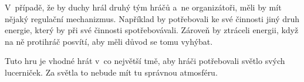 V~případě, že by duchy hrál druhý tým hráčů a~ne organizátoři, měli by mít nějaký regulační mechanizmus.
Například by potřebovali ke své činnosti jiný druh energie, který by při své činnosti spotřebovávali.
Zároveň by ztráceli energii, když na ně protihráč posvítí, aby měli důvod se tomu vyhýbat.

Tuto hru je vhodné hrát v~co největší tmě, aby hráči potřebovali světlo svých lucerniček.
Za světla to nebude mít tu správnou atmosféru.
